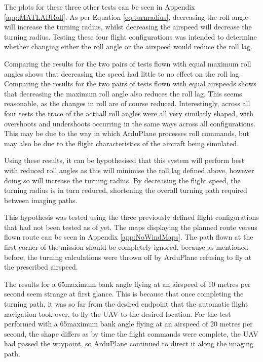 
The plots for these three other tests can be seen in Appendix \ref{app:MATLABRoll}. As per Equation \ref{eq:turnradius}, decreasing the roll angle will increase the turning radius, whilst decreasing the airspeed will decrease the turning radius. Testing these four flight configurations was intended to determine whether changing either the roll angle or the airspeed would reduce the roll lag. 

Comparing the results for the two pairs of tests flown with equal maximum roll angles shows that decreasing the speed had little to no effect on the roll lag. Comparing the results for the two pairs of tests flown with equal airspeeds shows that decreasing the maximum roll angle also reduces the roll lag. This seems reasonable, as the changes in roll are of course reduced. Interestingly, across all four tests the trace of the actuall roll angles were all very similarly shaped, with overshoots and undershoots occurring in the same ways across all configurations. This may be due to the way in which ArduPlane processes roll commands, but may also be due to the flight characteristics of the aircraft being simulated.


Using these results, it can be hypothesised that this system will perform best with reduced roll angles as this will minimise the roll lag defined above, however doing so will increase the turning radius. By decreasing the flight speed, the turning radius is in turn reduced, shortening the overall turning path required between imaging paths. 

This hypothesis was tested using the three previously defined flight configurations that had not been tested as of yet. The maps displaying the planned route versus flown route can be seen in Appendix \ref{app:NoWindMaps}. The path flown at the first corner of the mission should be completely ignored, because as mentioned before, the turning calculations were thrown off by ArduPlane refusing to fly at the prescribed airspeed. 

The results for a 65\degree maximum bank angle flying at an airspeed of 10 metres per second seem strange at first glance. This is because that once completing the turning path, it was so far from the desired endpoint that the automatic flight navigation took over, to fly the UAV to the desired location. For the test performed with a 65\degree maximum bank angle flying at an airspeed of 20 metres per second, the shape differs as by time the flight commands were complete, the UAV had passed the waypoint, so ArduPlane continued to direct it along the imaging path. 

